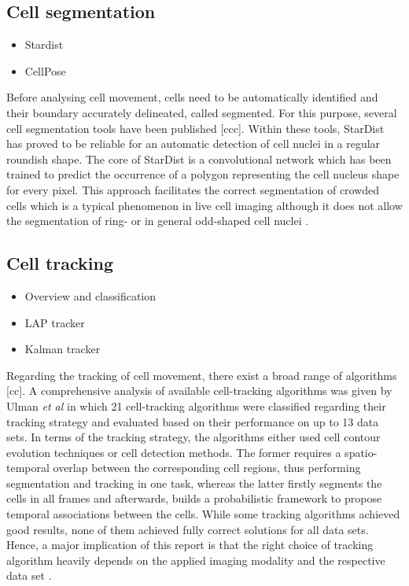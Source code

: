 \documentclass{report}
\begin{document}
\subsection{Cell segmentation}

\begin{itemize}
	\item Stardist
	\item CellPose
\end{itemize}

Before analysing cell movement, cells need to be automatically identified and their boundary accurately delineated, called segmented. For this purpose, several cell segmentation tools have been published [ccc]. Within these tools, StarDist has proved to be reliable for an automatic detection of cell nuclei in a regular roundish shape. The core of StarDist is a convolutional network which has been trained to predict the occurrence of a polygon representing the cell nucleus shape for every pixel. This approach facilitates the correct segmentation of crowded cells which is a typical phenomenon in live cell imaging although it does not allow the segmentation of ring- or in general odd-shaped cell nuclei \citep{RN285}. 

\subsection{Cell tracking}

\begin{itemize}
	\item Overview and classification
	\item LAP tracker
	\item Kalman tracker
\end{itemize}

Regarding the tracking of cell movement, there exist a broad range of algorithms [cc]. A comprehensive analysis of available cell-tracking algorithms was given by Ulman \textit{et al} in which 21 cell-tracking algorithms were classified regarding their tracking strategy and evaluated based on their performance on up to 13 data sets.
In terms of the tracking strategy, the algorithms either used cell contour evolution techniques or cell detection methods. The former requires a spatio-temporal overlap between the corresponding cell regions, thus performing segmentation and tracking in one task, whereas the latter firstly segments the cells in all frames and afterwards, builds a probabilistic framework to propose temporal associations between the cells. While some tracking algorithms achieved good results, none of them achieved fully correct solutions for all data sets. Hence, a major implication of this report is that the right choice of tracking algorithm heavily depends on the applied imaging modality and the respective data set \citep{RN292}. 
\end{document}
